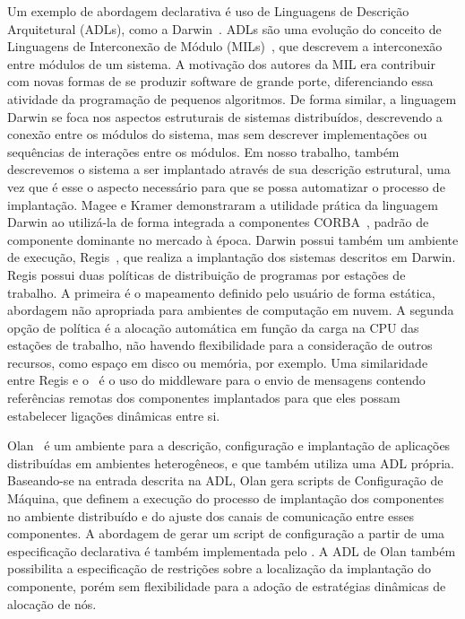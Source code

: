Um exemplo de abordagem declarativa é uso de Linguagens de Descrição Arquitetural (ADLs), como a Darwin~\cite{Magee1996Dynamic}. ADLs são uma evolução do conceito de Linguagens de Interconexão de Módulo (MILs)~\cite{DeRemer1976Programming}, que descrevem a interconexão entre módulos de um sistema. A motivação dos autores da MIL era contribuir com novas formas de se produzir software de grande porte, diferenciando essa atividade da programação de pequenos algoritmos. De forma similar, a linguagem Darwin se foca nos aspectos estruturais de sistemas distribuídos, descrevendo a conexão entre os módulos do sistema, mas sem descrever implementações ou sequências de interações entre os módulos. Em nosso trabalho, também descrevemos o sistema a ser implantado através de sua descrição estrutural, uma vez que é esse o aspecto necessário para que se possa automatizar o processo de implantação. Magee e Kramer demonstraram a utilidade prática da linguagem Darwin ao utilizá-la de forma integrada a componentes CORBA~\cite{Magee1997Corba}, padrão de componente dominante no mercado à época. Darwin possui também um ambiente de execução, Regis~\cite{Magee1994Regis}, que realiza a implantação dos sistemas descritos em Darwin. Regis possui duas políticas de distribuição de programas por estações de trabalho. A primeira é o mapeamento definido pelo usuário de forma estática, abordagem não apropriada para ambientes de computação em nuvem. A segunda opção de política é a alocação automática em função da carga na CPU das estações de trabalho, não havendo flexibilidade para a consideração de outros recursos, como espaço em disco ou memória, por exemplo. Uma similaridade entre Regis e o \ee\ é o uso do middleware para o envio de mensagens contendo referências remotas dos componentes implantados para que eles possam estabelecer ligações dinâmicas entre si.

Olan~\cite{Balter1998Olan} é um ambiente para a descrição, configuração e implantação de aplicações distribuídas em ambientes heterogêneos, e que também utiliza uma ADL própria. Baseando-se na entrada descrita na ADL, Olan gera scripts de Configuração de Máquina, que definem a execução do processo de implantação dos componentes no ambiente distribuído e do ajuste dos canais de comunicação entre esses componentes. A abordagem de gerar um script de configuração a partir de uma especificação declarativa é também implementada pelo \ee. A ADL de Olan também possibilita a especificação de restrições sobre a localização da implantação do componente, porém sem flexibilidade para a adoção de estratégias dinâmicas de alocação de nós.

